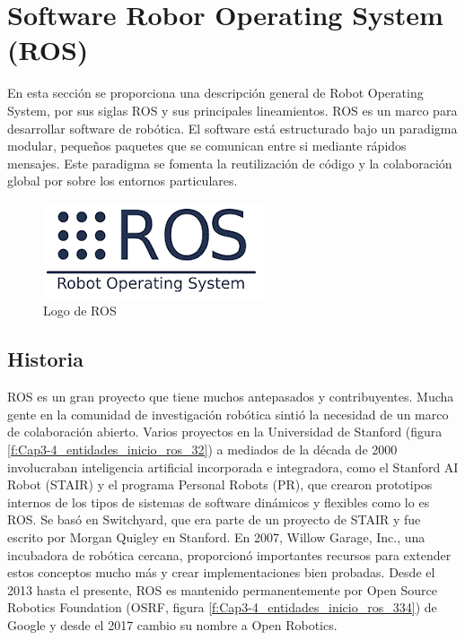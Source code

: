     \newpage

\section{Software Robor Operating System (ROS)}
    
        En esta sección se proporciona una descripción general de Robot Operating System, por sus siglas ROS y sus principales lineamientos. ROS es un marco para desarrollar software de robótica. El software está estructurado bajo un paradigma modular, pequeños paquetes que se comunican entre si mediante rápidos mensajes. Este paradigma se fomenta la reutilización de código y la colaboración global por sobre los entornos particulares.
    
    \begin{figure}[htb]
        \centering
        \includegraphics[width=0.5\linewidth]{Main/Chapter3/Images3/3-4/logo-ros.png}
        \caption{Logo de ROS \cite{ros2222}}
        \label{f:Cap3-4_logo_ros}
    \end{figure}
    
    \subsection{Historia}
    
        ROS es un gran proyecto que tiene muchos antepasados y contribuyentes. Mucha gente en la comunidad de investigación robótica sintió la necesidad de un marco de colaboración abierto. Varios proyectos en la Universidad de Stanford (figura \ref{f:Cap3-4_entidades_inicio_ros_32}) a mediados de la década de 2000 involucraban inteligencia artificial incorporada e integradora, como el Stanford AI Robot (STAIR) y el programa Personal Robots (PR), que crearon prototipos internos de los tipos de sistemas de software dinámicos y flexibles como lo es ROS. Se basó en Switchyard, que era parte de un proyecto de STAIR y fue escrito por Morgan Quigley en Stanford. En 2007, Willow Garage, Inc., una incubadora de robótica cercana, proporcionó importantes recursos para extender estos conceptos mucho más y crear implementaciones bien probadas. Desde el 2013 hasta el presente, ROS es mantenido permanentemente por Open Source Robotics Foundation (OSRF, figura \ref{f:Cap3-4_entidades_inicio_ros_334}) de Google y desde el 2017 cambio su nombre a Open Robotics.
        
